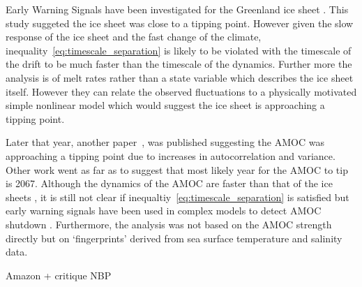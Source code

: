 Early Warning Signals have been investigated for the Greenland ice sheet \parencite{Boers2021}. This study suggeted the ice sheet was close to a tipping point. However given the slow response of the ice sheet and
the fast change of the climate, inequality~\ref{eq:timescale_separation} is likely to be violated with the timescale of the drift to be much faster than the timescale of the dynamics. Further more the analysis is of melt rates
rather than a state variable which describes the ice sheet itself. However they can relate the observed fluctuations to a physically motivated simple nonlinear model which would suggest the ice sheet is approaching a tipping point.

Later that year, another paper~\cite{Boers2021a}, was published suggesting the AMOC was approaching a tipping point due to increases in autocorrelation and variance. Other work \parencite{Ditlevsen2022arxiv} went as far
as to suggest that most likely year for the AMOC to tip is 2067. Although the dynamics of the AMOC are faster than that of the ice sheets \parencite{ArmstrongMcKay2022}, it is still not clear if
inequaltiy~\ref{eq:timescale_separation} is satisfied but early warning signals have been used in complex models to detect AMOC shutdown \parencite{Boulton2014}.
Furthermore, the analysis was not based on the AMOC strength directly but on `fingerprints' derived from sea surface temperature and salinity data.

Amazon    + critique
NBP